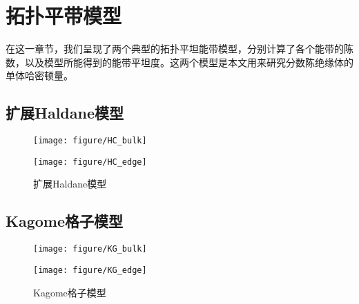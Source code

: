\chapter{拓扑平带模型}
\label{sec:models}
在这一章节，我们呈现了两个典型的拓扑平坦能带模型，分别计算了各个能带的陈数，以及模型所能得到的能带平坦度。这两个模型是本文用来研究分数陈绝缘体的单体哈密顿量。

\section{扩展Haldane模型}



\begin{figure}[ht]
  \begin{minipage}[c]{0.5\textwidth}
  \texttt{[image: figure/HC\_bulk]}
  \hspace{5in}
  \end{minipage}
  \begin{minipage}[c]{0.5\textwidth}
  \texttt{[image: figure/HC\_edge]}
  \end{minipage}
\caption{扩展Haldane模型}
\label{fig:TFB_HC}
\end{figure}


\section{Kagome格子模型}

\begin{figure}[ht]
  \begin{minipage}[c]{0.5\textwidth}
  \texttt{[image: figure/KG\_bulk]}
  \hspace{5in}
  \end{minipage}
  \begin{minipage}[c]{0.5\textwidth}
  \texttt{[image: figure/KG\_edge]}
  \end{minipage}
\caption{Kagome格子模型}
\label{fig:TFB_KG}
\end{figure}